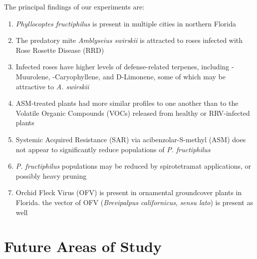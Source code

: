 \documentclass{ufdissertation}[overrideChapters] %
\providecommand{\tightlist}{%
  \setlength{\itemsep}{0pt}\setlength{\parskip}{0pt}}
\begin{document}
{The principal findings of our experiments are:
\begin{enumerate}
\def\labelenumi{\arabic{enumi}.}
\tightlist
\item
  \emph{Phyllocoptes fructiphilus} is present in multiple cities in northern Florida
\item
  The predatory mite \emph{Amblyseius swirskii} is attracted to roses infected with Rose Rosette Disease (RRD)
\item
  Infected roses have higher levels of defense-related terpenes, including \textgamma-Muurolene, \textbeta-Caryophyllene, and D-Limonene, some of which may be attractive to \emph{A. swirskii}
\item
  ASM-treated plants had more similar profiles to one another than to the Volatile Organic Compounds (VOCs) released from healthy or RRV-infected plants
\item
  Systemic Acquired Resistance (SAR) via acibenzolar-S-methyl (ASM) does not appear to significantly reduce populations of \emph{P. fructiphilus}
\item
  \emph{P. fructiphilus} populations may be reduced by spirotetramat applications, or possibly heavy pruning
\item
  Orchid Fleck Virus (OFV) is present in ornamental groundcover plants in Florida. the vector of OFV (\emph{Brevipalpus californicus}, \emph{sensu lato}) is present as well
\end{enumerate}
\hypertarget{future-areas-of-study}{%
\section{Future Areas of Study}\label{future-areas-of-study}}

}
\end{document}

